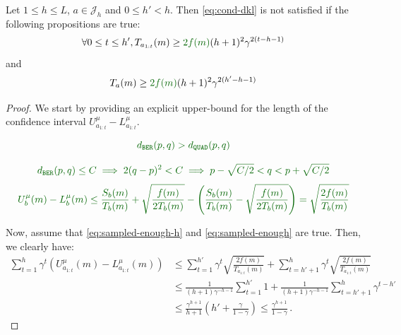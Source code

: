 \begin{lemma}
	\label{lemma:ci-length}
	\begin{leftbar}[lemmabar]
	Let $1 \leq h \leq L$, $a\in \mathcal{J}_h$ and $0 \leq h' < h$. Then  \eqref{eq:cond-dkl} is not satisfied if the following propositions are true:
	\begin{equation}
	\label{eq:sampled-enough-h}
	\forall 0\leq t\leq h', T_{a_{1:t}}(m) \geq \diff{2f(m)}(h+1)^2\gamma^{2(t-h-1)}
	\end{equation}
	and
	\begin{equation}
	\label{eq:sampled-enough}
	T_{a}(m) \geq \diff{2f(m)}(h+1)^2\gamma^{2(h'-h-1)}
	\end{equation}
	\end{leftbar}
\end{lemma}
\begin{proof}
	We start by providing an explicit upper-bound for the length of the confidence interval $U^{\mu}_{a_{1:t}} - L^{\mu}_{a_{1:t}}$. 
	
	\begin{equation*}
	\diff{\dber(p, q) > \dquad(p, q)}
	\end{equation*}
	
	\begin{equation*}
	\diff{\dber(p, q) \leq C   \implies 2(q - p)^2 < C  \implies p - \sqrt{C/2} < q < p + \sqrt{C/2}}
	\end{equation*}
	\begin{align*}
	\diff{U^{\mu}_{b}(m) - L^{\mu}_{b}(m) \leq \frac{S_b(m)}{T_b(m)} + \sqrt{\frac{f(m)}{2T_b(m)}} -  \left(\frac{S_b(m)}{T_b(m)} - \sqrt{\frac{f(m)}{2T_b(m)}}\right) 
		= \sqrt{\frac{2f(m)}{T_b(m)}}}
	\end{align*}
	
	Now, assume that \eqref{eq:sampled-enough-h} and \eqref{eq:sampled-enough} are true. Then, we clearly have:
	\begin{align*}
	\sum_{t=1}^h \gamma^t\left(U^{\mu}_{a_{1:t}}(m) - L^{\mu}_{a_{1:t}}(m)\right) &\leq \sum_{t=1}^{h'} \gamma^t \sqrt{\frac{2f(m)}{T_{a_{1:t}}(m)}} + \sum_{t=h'+1}^h \gamma^t \sqrt{\frac{2f(m)}{T_{a_{1:t}}(m)}} \\
	&\leq \frac{1}{(h+1)\gamma^{-h-1}} \sum_{t=1}^{h'} 1 + \frac{1}{(h+1)\gamma^{-h-1}} \sum_{t=h'+1}^h \gamma^{t-h'}  \\
	&\leq \frac{\gamma^{h+1}}{h+1} \left( h' + \frac{\gamma}{1-\gamma} \right)\leq \frac{\gamma^{h+1}}{1-\gamma}\,.
	\end{align*}
\end{proof}

